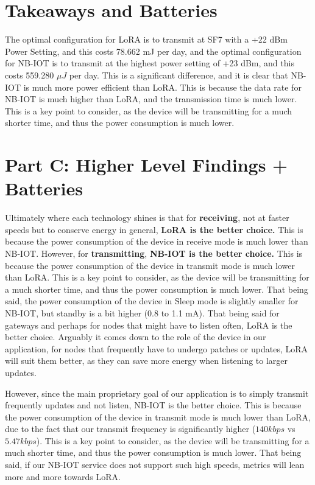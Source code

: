 \section{Takeaways and Batteries}
\label{sec:Takeaways}
The optimal configuration for LoRA is to transmit at SF7 with a +22 dBm Power Setting, and this costs 78.662 mJ per day, and the optimal configuration for NB-IOT is to transmit at the highest power setting of +23 dBm, and this costs 559.280 $\mu J$ per day. This is a significant difference, and it is clear that NB-IOT is much more power efficient than LoRA. This is because the data rate for NB-IOT is much higher than LoRA, and the transmission time is much lower. This is a key point to consider, as the device will be transmitting for a much shorter time, and thus the power consumption is much lower. 

\section{Part C: Higher Level Findings + Batteries}


Ultimately where each technology shines is that for \textbf{receiving}, not at faster speeds but to conserve energy in general, \textbf{LoRA is the better choice.} This is because the power consumption of the device in receive mode is much lower than NB-IOT. However, for \textbf{transmitting}, \textbf{NB-IOT is the better choice.} This is because the power consumption of the device in transmit mode is much lower than LoRA. This is a key point to consider, as the device will be transmitting for a much shorter time, and thus the power consumption is much lower. That being said, the power consumption of the device in Sleep mode is slightly smaller for NB-IOT, but standby is a bit higher (0.8 to 1.1 mA). That being said for gateways and perhaps for nodes that might have to listen often, LoRA is the better choice. Arguably it comes down to the role of the device in our application, for nodes that frequently have to undergo patches or updates, LoRA will suit them better, as they can save more energy when listening to larger updates. 

However, since the main proprietary goal of our application is to simply transmit frequently updates and not listen, NB-IOT is the better choice. This is because the power consumption of the device in transmit mode is much lower than LoRA, due to the fact that our transmit frequency is significantly higher ($140 kbps$ vs $5.47 kbps$). This is a key point to consider, as the device will be transmitting for a much shorter time, and thus the power consumption is much lower. That being said, if our NB-IOT service does not support such high speeds, metrics will lean more and more towards LoRA. 


